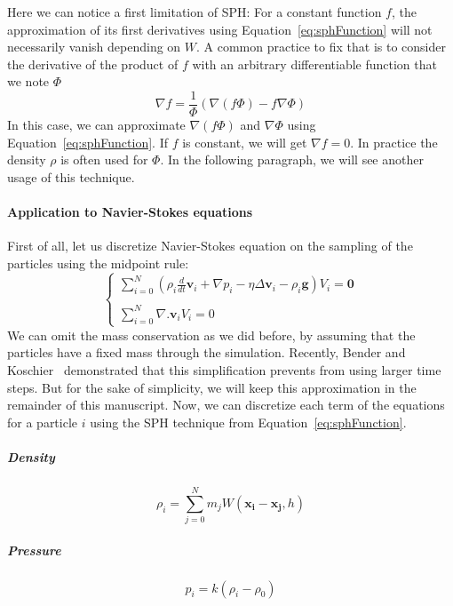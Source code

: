 Here we can notice a first limitation of SPH: For a constant function $f$, the approximation of its first derivatives using Equation~\eqref{eq:sphFunction} will not necessarily vanish depending on $W$. A common practice to fix that is to consider the derivative of the product of $f$ with an arbitrary differentiable function that we note $\Phi$
\begin{equation}
\label{eq:hackSPH}
\nabla f = \frac{1}{\Phi}\left(\nabla (f \Phi) - f \nabla \Phi \right)
\end{equation}
In this case, we can approximate $\nabla(f\Phi)$ and $\nabla \Phi$ using Equation~\eqref{eq:sphFunction}. If $f$ is constant, we will get $\nabla f = 0$. In practice the density $\rho$ is often used for $\Phi$. In the following paragraph, we will see another usage of this technique.
\paragraph{Application to Navier-Stokes equations}
First of all, let us discretize Navier-Stokes equation on the sampling of the particles using the midpoint rule:
\begin{equation}
\label{eq:particleNavierStokes}
\left\lbrace
\begin{array}{ll}
\displaystyle \sum_{i=0}^{N} \left( \rho_{i} \frac{d}{dt} \mathbf{v}_{i} + \nabla p_{i} - \eta \Delta \mathbf{v}_{i} - \rho_{i} \mathbf{g} \right) V_{i} = \mathbf{0}\\ \\
\displaystyle \sum_{i=0}^{N} \nabla. \mathbf{v}_{i} V_{i} = 0
\end{array}
\right.
\end{equation}
We can omit the mass conservation as we did before, by assuming that the particles have a fixed mass through the simulation. Recently, Bender and Koschier~\cite{Bender2015} demonstrated that this simplification prevents from using larger time steps. But for the sake of simplicity, we will keep this approximation in the remainder of this manuscript. Now, we can discretize each term of the equations for a particle $i$ using the SPH technique from Equation~\eqref{eq:sphFunction}.
\subparagraph{Density}
\begin{equation}
\label{eq:densitySPH}
\rho_{i} = \sum_{j=0}^{N} m_{j}W(\mathbf{x_{i}}-\mathbf{x_{j}},h)
\end{equation}
\subparagraph{Pressure}
\begin{equation}
\label{eq:pressureSPH}
p_{i} = k\left(\rho_{i}-\rho_{0}\right)
\end{equation}
